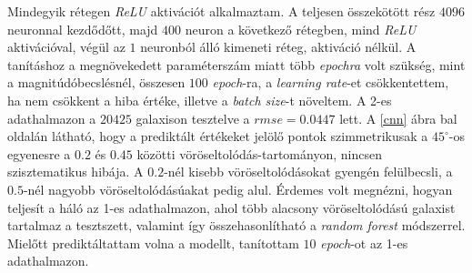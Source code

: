 \documentclass[12pt,letterpaper,twoside,openright]{book}
\begin{document}
Mindegyik rétegen \textit{ReLU} aktivációt alkalmaztam. A teljesen összekötött rész $\num{4096}$ neuronnal kezdődőtt, majd $400$ neuron a következő rétegben, mind \textit{ReLU} aktivációval, végül az $1$ neuronból álló kimeneti réteg, aktiváció nélkül.
 \newline \indent
A tanításhoz a megnövekedett paraméterszám miatt több \textit{epochra} volt szükség, mint a magnitúdóbecslésnél, összesen $100$ \textit{epoch}-ra, a \textit{learning rate}-et  csökkentettem, ha nem csökkent a hiba értéke, illetve a \textit{batch size}-t növeltem. A 2-es adathalmazon a $\num{20425}$ galaxison tesztelve a $\textit{rmse} = 0.0447$ lett. A \ref{cnn} ábra bal oldalán látható, hogy a prediktált értékeket jelölő pontok szimmetrikusak a $45^{\circ}$-os egyenesre a $0.2$ és $0.45$ közötti vöröseltolódás-tartományon, nincsen szisztematikus hibája. A $0.2$-nél kisebb vöröseltolódásokat gyengén felülbecsli, a $0.5$-nél nagyobb vöröseltolódásúakat pedig alul. Érdemes volt megnézni, hogyan teljesít a háló az 1-es adathalmazon, ahol több alacsony vöröseltolódású galaxist tartalmaz a tesztszett, valamint így összehasonlítható a \textit{random forest} módszerrel. Mielőtt prediktáltattam volna a modellt, tanítottam $10$ \textit{epoch}-ot az 1-es adathalmazon.
\end{document}

